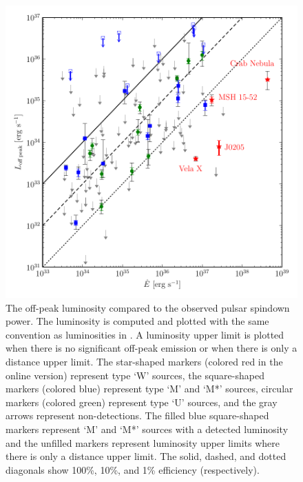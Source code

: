 \begin{figure}
  \includegraphics{chapters/offpeak/figures/off_peak_luminosity_vs_edot_color.pdf}
  \caption{The off-peak luminosity compared to the observed pulsar spindown power. 
  The luminosity is computed and plotted with the same convention as
  luminosities in \cite{abdo_2013a_second-fermi}.
  A luminosity upper limit is plotted
  when there is no significant off-peak emission or when there
  is only a distance upper limit.
  The
  star-shaped markers (colored red in the online version) represent
  type `W' sources, the square-shaped markers (colored blue) represent type `M' 
  and `M*' sources, 
  circular markers (colored green) represent type `U' sources,
  and the gray arrows represent non-detections.
  The filled blue square-shaped markers represent `M' and `M*' sources
  with a detected luminosity and the unfilled markers represent luminosity
  upper limits where there is only a distance upper limit.
  The solid, dashed, and dotted diagonals show 100\%, 10\%, and 1\% efficiency
  (respectively).
  }
\end{figure}
